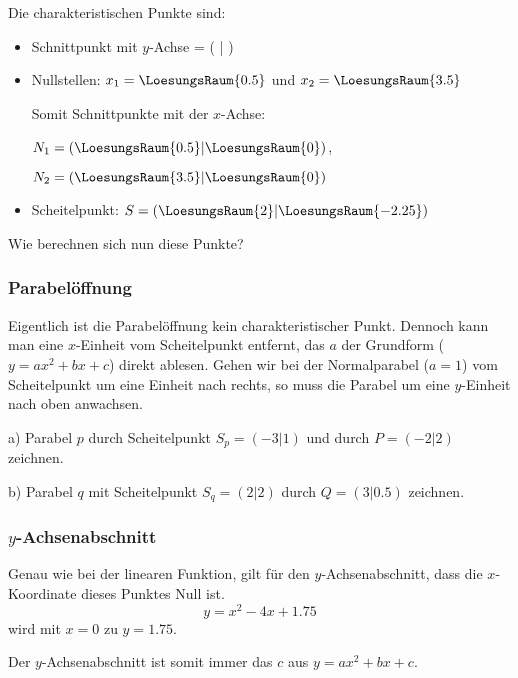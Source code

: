 Die charakteristischen Punkte sind:
\begin{itemize}
\item Schnittpunkt mit $y$-Achse = ( | )
\item Nullstellen: $x_1=\LoesungsRaum{0.5}$ und $x_2=\LoesungsRaum{3.5}$

  Somit Schnittpunkte mit der $x$-Achse:
  
  $N_1=(\LoesungsRaum{0.5}| \LoesungsRaum{0})$,

  $N_2=( \LoesungsRaum{3.5}|\LoesungsRaum{0})$
  
\item Scheitelpunkt: $S=(\LoesungsRaum{2}|\LoesungsRaum{-2.25})$
\end{itemize}
 
Wie berechnen sich nun diese Punkte?
\newpage
\subsubsection{Parabelöffnung}
Eigentlich ist die Parabelöffnung kein charakteristischer
Punkt. Dennoch kann man eine $x$-Einheit vom Scheitelpunkt entfernt,
das $a$ der Grundform ($y=ax^2+bx+c$) direkt ablesen. Gehen wir bei
der Normalparabel ($a=1$) vom
Scheitelpunkt um eine Einheit nach rechts, so muss die Parabel um eine
$y$-Einheit nach oben anwachsen.

a) Parabel $p$ durch Scheitelpunkt $S_p=(-3|1)$ und durch $P=(-2|2)$ zeichnen. 


b) Parabel $q$ mit Scheitelpunkt $S_q=(2|2)$ durch $Q=(3|0.5)$ zeichnen.



\subsubsection{$y$-Achsenabschnitt}
Genau wie bei der linearen Funktion, gilt für den $y$-Achsenabschnitt,
dass die $x$-Koordinate dieses Punktes Null ist.
$$y = x^2 -4x + 1.75$$
wird mit $x=0$ zu
$y = 1.75$.

Der $y$-Achsenabschnitt ist somit immer das $c$ aus $y = ax^2 + bx +
c$.

